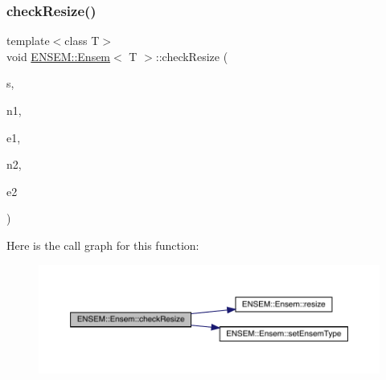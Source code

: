 \subsubsection{\texorpdfstring{checkResize()}{checkResize()}\hspace{0.1cm}{\footnotesize\ttfamily [3/6]}}
{\footnotesize\ttfamily template$<$class T$>$ \\
void \mbox{\hyperlink{classENSEM_1_1Ensem}{E\+N\+S\+E\+M\+::\+Ensem}}$<$ T $>$\+::check\+Resize (\begin{DoxyParamCaption}\item[{const char $\ast$}]{s,  }\item[{int}]{n1,  }\item[{\mbox{\hyperlink{namespaceENSEM_a2dc2c4a26884f343471e52f23479ddbe}{Ensem\+Type\+\_\+t}}}]{e1,  }\item[{int}]{n2,  }\item[{\mbox{\hyperlink{namespaceENSEM_a2dc2c4a26884f343471e52f23479ddbe}{Ensem\+Type\+\_\+t}}}]{e2 }\end{DoxyParamCaption})\hspace{0.3cm}{\ttfamily [inline]}}

Here is the call graph for this function\+:
\nopagebreak
\begin{figure}[H]
\begin{center}
\leavevmode
\includegraphics[width=350pt]{d7/d3e/classENSEM_1_1Ensem_acb139b6e03db52a9190de9ea4830addb_cgraph}
\end{center}
\end{figure}
\mbox{\label{classENSEM_1_1Ensem_acb139b6e03db52a9190de9ea4830addb}} 
